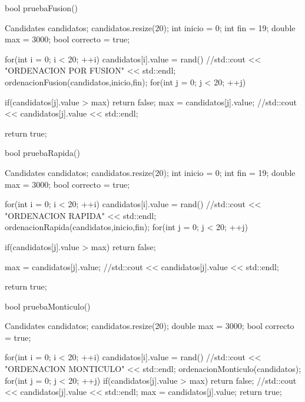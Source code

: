 bool pruebaFusion()
{
	Candidates candidatos;
	candidatos.resize(20);
	int inicio = 0;
	int fin = 19;
	double max = 3000;
	bool correcto = true;

	for(int i = 0; i < 20; ++i)
	{
		candidatos[i].value = rand() %
	}
	//std::cout << "ORDENACION POR FUSION" << std::endl;
	ordenacionFusion(candidatos,inicio,fin);
	for(int j = 0; j < 20; ++j)
	{
		if(candidatos[j].value > max)
		{
			return false;
		}
		max = candidatos[j].value;
		//std::cout << candidatos[j].value << std::endl;

	}
	return true;
}

bool pruebaRapida()
{
	Candidates candidatos;
	candidatos.resize(20);
	int inicio = 0;
	int fin = 19;
	double max = 3000;
	bool correcto = true;

	for(int i = 0; i < 20; ++i)
	{
		candidatos[i].value = rand() %
	}
	//std::cout << "ORDENACION RAPIDA" << std::endl;
	ordenacionRapida(candidatos,inicio,fin);
	for(int j = 0; j < 20; ++j)
	{
		if(candidatos[j].value > max)
		{
			return false;
		}
		
		max = candidatos[j].value;
		//std::cout << candidatos[j].value << std::endl;
		
	}
	return true;
}

bool pruebaMonticulo()
{
	Candidates candidatos;
	candidatos.resize(20);
	double max = 3000;
	bool correcto = true;

	for(int i = 0; i < 20; ++i)
	{
		candidatos[i].value = rand() %
	}
	//std::cout << "ORDENACION MONTICULO" << std::endl;
	ordenacionMonticulo(candidatos);
	for(int j = 0; j < 20; ++j)
	{
		if(candidatos[j].value > max)
		{
			return false;
		}
		//std::cout << candidatos[j].value << std::endl;
		max = candidatos[j].value;
	}
	return true;
}
